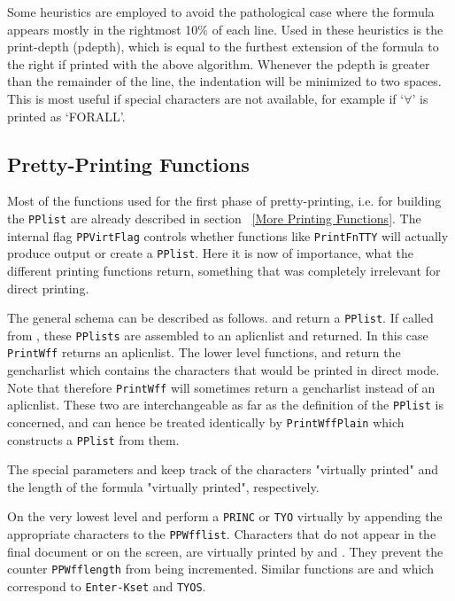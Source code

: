 Some heuristics are employed to avoid the pathological case where the
formula appears mostly in the rightmost 10\% of each line.  Used in these
heuristics is the print-depth (pdepth), which is equal to the furthest
extension of the formula to the right if printed with the above algorithm.
Whenever the pdepth is greater than the remainder of the line, the indentation
will be minimized to two spaces. This is most useful if special
characters are not available, for example if `$\forall$' is printed as `FORALL'.

\subsection{Pretty-Printing Functions}\label{Pretty-Printing Functions}

Most of the functions used for the first phase of pretty-printing, i.e. for
building the {\tt PPlist} are already described in section ~\ref{More Printing Functions}.
The internal flag {\tt PPVirtFlag} controls whether functions like {\tt PrintFnTTY}
will actually produce output or create a {\tt PPlist}.  Here it is now of
importance, what the different printing functions return, something that was 
completely irrelevant for direct printing.

The general schema can be described as follows.   and
 return a {\tt PPlist}.  If called from , these
{\tt PPlists} are assembled to an aplicnlist and returned.  In this case {\tt PrintWff}
returns an aplicnlist.  The lower level functions, 
and  return the gencharlist which contains the
characters that would be printed in direct mode.  Note that therefore {\tt PrintWff}
will sometimes return a gencharlist instead of an aplicnlist.  These
two are interchangeable as far as the definition of the {\tt PPlist} is
concerned, and can hence be treated identically by {\tt PrintWffPlain}
which constructs a {\tt PPlist} from them.  

The special parameters  and 
keep track of the characters "virtually printed" and the length of
the formula "virtually printed", respectively.

On the very lowest level  and  perform a {\tt PRINC}
or {\tt TYO} virtually by appending the appropriate characters to the
{\tt PPWfflist}.  Characters that do not appear in the final document
or on the screen, are virtually printed by  and .
They prevent the counter {\tt PPWfflength} from being incremented.  Similar
functions are  and  which correspond to
{\tt Enter-Kset} and {\tt TYOS}.

